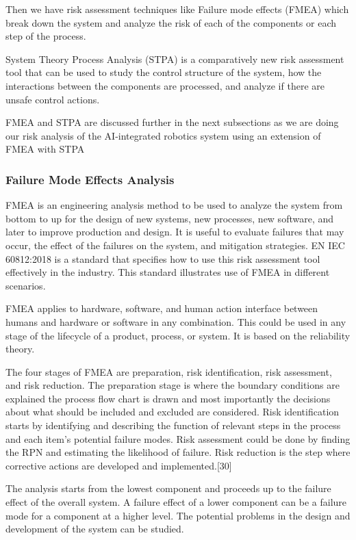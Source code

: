 {Then we have risk assessment techniques like Failure mode effects (FMEA) which break down the system and analyze the risk of each of the components or each step of the process. 

System Theory Process Analysis (STPA) is a comparatively new risk assessment tool that can be used to study the control structure of the system, how the interactions between the components are processed, and analyze if there are unsafe control actions.

FMEA and STPA are discussed further in the next subsections as we are doing our risk analysis of the AI-integrated robotics system using an extension of FMEA with STPA




\subsubsection{\RaggedRight Failure Mode Effects Analysis }
FMEA is an engineering analysis method to be used to analyze the system from bottom to up for the design of new systems, 
 new processes, new software, and later to improve production and design. It is useful to evaluate failures that may occur, the effect of the failures on the system, and mitigation strategies. EN IEC 60812:2018 is a standard that specifies how to use this risk assessment tool effectively in the industry. This standard illustrates use of FMEA in different scenarios. 

FMEA applies to hardware, software, and human action interface between humans and hardware or software in any combination. This could be used in any stage of the lifecycle of a product, process, or system. It is based on the reliability theory.

The four stages of FMEA are preparation, risk identification, risk assessment, and risk reduction. The preparation stage is where the boundary conditions are explained the process flow chart is drawn and most importantly the decisions about what should be included and excluded are considered. Risk identification starts by identifying and describing the function of relevant steps in the process and each item's potential failure modes. Risk assessment could be done by finding the RPN and estimating the likelihood of failure. Risk reduction is the step where corrective actions are developed and implemented.[30]

The analysis starts from the lowest component and proceeds up to the failure effect of the overall system. A failure effect of a lower component can be a failure mode for a component at a higher level. The potential problems in the design and development of the system can be studied.

}
